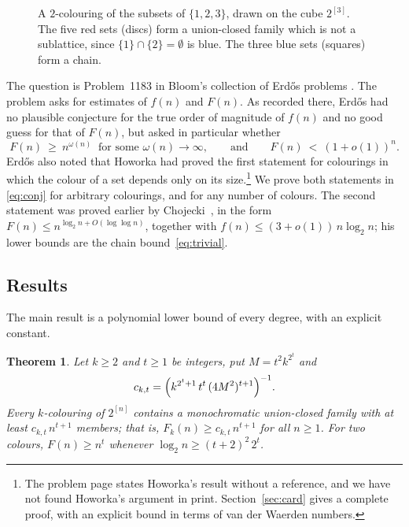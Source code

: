 \documentclass[11pt,reqno]{amsart}
\numberwithin{equation}{section}
\theoremstyle{plain}
\newtheorem{theorem}{Theorem}[section]
\theoremstyle{definition}
\theoremstyle{remark}
\begin{document}
\begin{figure}[t]
\centering

\caption{A $2$-colouring of the subsets of $\{1,2,3\}$, drawn on the
cube $2^{[3]}$. The five red sets (discs) form a union-closed family which
is not a sublattice, since $\{1\}\cap\{2\}=\emptyset$ is blue. The three
blue sets (squares) form a chain.}
\label{fig:lattice}
\end{figure}

The question is Problem~1183 in Bloom's collection of Erd\H{o}s problems
\cite{Bl26}. The problem asks for estimates of $f(n)$ and $F(n)$. As recorded there, Erd\H{o}s had no plausible
conjecture for the true order of magnitude of $f(n)$ and no good guess
for that of $F(n)$, but asked in particular whether
\begin{equation}
\label{eq:conj}
F(n)\ \ge\ n^{\omega(n)}\ \text{ for some }\omega(n)\to\infty,
\qquad\text{and}\qquad
F(n)\ <\ (1+o(1))^{n}.
\end{equation}
Erd\H{o}s also noted that Howorka had proved the first statement for
colourings in which the colour of a set depends only on its
size.\footnote{The problem page states Howorka's result without a
reference, and we have not found Howorka's argument in print.
Section~\ref{sec:card} gives a complete proof, with an explicit bound in
terms of van der Waerden numbers.} We prove both statements in
\eqref{eq:conj} for arbitrary colourings, and for any number of colours.
The second statement was proved earlier by Chojecki~\cite{Ch26}, in the
form $F(n)\le n^{\log_2n+O(\log\log n)}$, together with
$f(n)\le(3+o(1))\,n\log_2n$; his lower bounds are the chain
bound~\eqref{eq:trivial}.

\subsection{Results}

The main result is a polynomial lower bound of every degree, with an
explicit constant.

\begin{theorem}
\label{thm:lower}
Let $k\ge2$ and $t\ge1$ be integers, put $M=t^{2}k^{2^{t}}$ and
\[
c_{k,t}=\Bigl(k^{2^{t}+1}\,t^{t}\,(4M^{2})^{t+1}\Bigr)^{-1}.
\]
Every $k$-colouring of $2^{[n]}$ contains a monochromatic union-closed
family with at least $c_{k,t}\,n^{t+1}$ members; that is,
$F_k(n)\ge c_{k,t}\,n^{t+1}$ for all $n\ge1$. For two colours,
$F(n)\ge n^{t}$ whenever $\log_2n\ge(t+2)^{2}\,2^{t}$.
\end{theorem}
\end{document}
